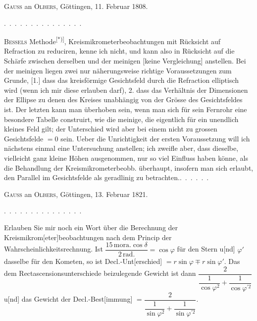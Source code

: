 \clearpage\begingroup

\begin{center}\textsc{Gauss} an \textsc{Olbers}, Göttingen, 11. Februar 1808.\end{center}
\noindent\mbox{. . . . . . . . . . . . . . .}\par
\noindent\hspace*{\parindent}\textsc{Bessels} Methode\textsuperscript{[*)]}, Kreismikrometerbeobachtungen mit Rücksicht auf Refraction zu reduciren, kenne ich nicht, und kann also in Rücksicht auf die Schärfe zwischen derselben und der meinigen [keine Vergleichung] anstellen. Bei der meinigen liegen zwei nur näherungsweise richtige Voraussetzungen zum Grunde, [1.] dass das kreisförmige Gesichtsfeld durch die Refraction elliptisch wird (wenn ich mir diese  erlauben darf), 2. dass das Verhältnis der Dimensionen der Ellipse zu denen des Kreises unabhängig von der Grösse des Gesichtsfeldes ist. Der letzten kann man überhoben sein, wenn man sich für sein Fernrohr eine besondere Tabelle construirt, wie die meinige, die eigentlich für ein unendlich kleines Feld gilt; der Unterschied wird aber bei einem nicht zu grossen Gesichtsfelde $=0$ sein. Ueber die Unrichtigkeit der ersten Voraussetzung will ich nächstens einmal eine Untersuchung anstellen; ich zweifle aber, dass dieselbe, vielleicht ganz kleine Höhen ausgenommen, nur so viel Einfluss haben könne, als die Behandlung der Kreismikrometerbeobb. überhaupt, insofern man sich erlaubt, den Parallel im Gesichtsfelde als geradlinig zu betrachten.\quad\mbox{. . . . . .}
\begingroup\renewcommand{\thefootnote}{[*)}\footnotetext{Monatl. Corresp, Bd. XVII, März 1808 ]}\endgroup
\begin{center}\textsc{Gauss} an \textsc{Olbers}, Göttingen, 13. Februar 1821.\end{center}
\noindent\mbox{. . . . . . . . . . . . . . .}\par
\begingroup\raggedright \noindent\hspace*{\parindent}Erlauben Sie mir noch ein Wort über die Berechnung der Kreismikrom[eter]beobachtungen nach dem Princip der Wahrscheinlichkeitsrechnung. Ist $\dfrac{15\,\mathrm{mora}.\cos\delta}{2\,\mathrm{rad.}}=\cos\varphi$ für den Stern u[nd] $\varphi'$ dasselbe für den Kometen, so ist Decl.-Unt[erschied] $=r\sin\varphi\mp r\sin\varphi'$. Das dem Rectascensionsunterschiede beizulegende Gewicht ist dann $\dfrac{2}{\dfrac{1}{\cos\varphi^2}+\dfrac{1}{\cos\varphi^{\prime 2}}}$ u[nd] das Gewicht der Decl.-Best[immung] $=\dfrac{2}{\dfrac{1}{\sin\varphi^2}+\dfrac{1}{\sin\varphi^{\prime 2}}}$.\par\endgroup

